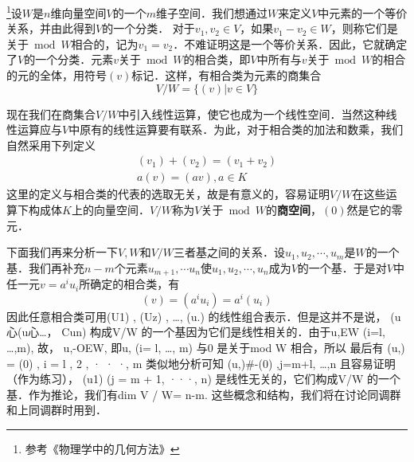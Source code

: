 

\footnote{参考《物理学中的几何方法》}设$W$是$n$维向量空间$V$的一个$m$维子空间．我们想通过$W$来定义$V$中元素的一个等价关系，并由此得到$V$的一个分类．
对于$v_1,v_2\in V$，如果$v_1-v_2\in W$，则称它们是关于$\bmod W $相合的，记为$v_1=v_2$．不难证明这是一个等价关系．因此，它就确定了$V $的一个分类．元素$v $关于$\bmod W $的相合类，即$V $中所有与$v $关于$\bmod W $的相合的元的全体，用符号$(v) $标记．这样，有相合类为元素的商集合
\begin{equation}
V / W=\{(v) | v \in V\}
\end{equation}

现在我们在商集合$V/W $中引入线性运算，使它也成为一个线性空间．当然这种线性运算应与$V $中原有的线性运算要有联系．为此，对于相合类的加法和数乘，我们自然采用下列定义
\begin{equation}
\begin{array}{l}\left(v_{1}\right)+\left(v_{2}\right)=\left(v_{1}+v_{2}\right) \\ a(v)=(a v), a \in K\end{array}
\end{equation}
这里的定义与相合类的代表的选取无关，故是有意义的，容易证明$V/W $在这些运算下构成体$K $上的向量空间．$V/W $称为$V $关于$\bmod W$的\textbf{商空间}，$(0)$然是它的零元．

下面我们再来分析一下$V,W$和$V/W $三者基之间的关系．设$u_1,u_2,\cdots,u_m$是$W $的一个基．我们再补充$n- m$个元素${u}_{m+1}, \cdots {u}_{n}$使$u_{1}, u_{2}, \cdots, u_{n}$成为$V$的一个基．于是对$V $中任一元$v=a^iu_i$所确定的相合类，有
\begin{equation}
(v)=\left(a^{i} u_{i}\right)=a^{i}\left(u_{i}\right)
\end{equation}
因此任意相合类可用(U1) , (Uz) , …, (u.) 的线性组合表示．但是这并不是说，
(u心(u心…， Cun) 构成V/W 的一个基因为它们是线性相关的．由于u,EW
(i=l, …,m), 故， u,-OEW, 即u, (i= l, …, m) 与0 是关于mod W 相合，所以
最后有
(u,) = (0) , i = l , 2 , · · ·, m
类似地分析可知
(u,)#-(0) ,j=m+l, …,n
且容易证明（作为练习）， (u1) (j = m + 1, ···, n) 是线性无关的，它们构成V/W
的一个基．作为推论，我们有dim V / W= n-m.
这些概念和结构，我们将在讨论同调群和上同调群时用到．